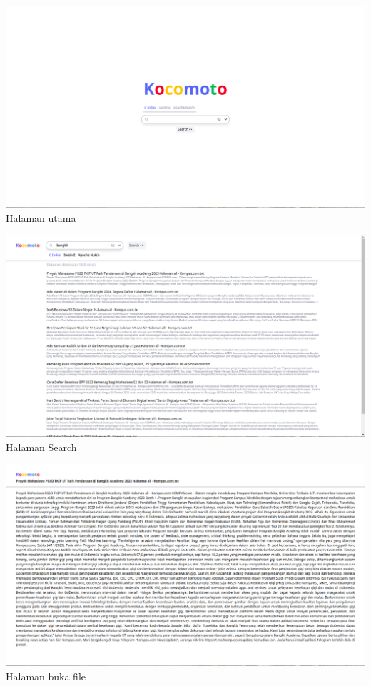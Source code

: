 \documentclass[12pt]{article}
\begin{document}
    \includegraphics[scale=0.42]{images/mainpage.png} \newline
    \centering
    Halaman utama

    \includegraphics[scale=0.42]{images/searchpage.png} \newline
    Halaman Search

    \includegraphics[scale=0.42]{images/openpage.png} \newline
    Halaman buka file
\end{document}
